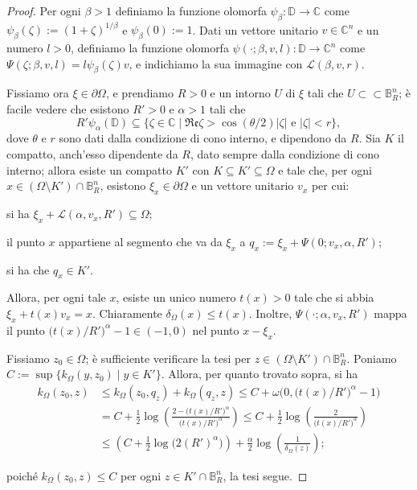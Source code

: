 \begin{proof}
    Per ogni $\beta>1$ definiamo la funzione olomorfa $\psi_\beta:\mathbb{D}\longrightarrow\mathbb{C}$ come $\psi_\beta(\zeta):=(1+\zeta)^{1/\beta}$ e $\psi_\beta(0):=1$. Dati un vettore unitario $v\in\mathbb{C}^n$ e un numero $l>0$, definiamo la funzione olomorfa $\psi(\cdot;\beta,v,l):\mathbb{D}\longrightarrow\mathbb{C}^n$ come $\Psi(\zeta;\beta,v,l)=l\psi_\beta(\zeta)v$, e indichiamo la sua immagine con $\mathcal{L}(\beta,v,r)$.
    
    Fissiamo ora $\xi\in\partial\Omega$, e prendiamo $R>0$ e un intorno $U$ di $\xi$ tali che $U\subset\subset\mathbb{B}^n_R$; è facile vedere che esistono $R'>0$ e $\alpha>1$ tali che
    $$R'\psi_\alpha(\mathbb{D})\subseteq \{\zeta\in\mathbb{C}\mid\mathfrak{Re}\zeta>\cos(\theta/2)|\zeta|\text{ e }|\zeta|<r\},$$
    dove $\theta$ e $r$ sono dati dalla condizione di cono interno, e dipendono da $R$. Sia $K$ il compatto, anch'esso dipendente da $R$, dato sempre dalla condizione di cono interno; allora esiste un compatto $K'$ con $K\subseteq K'\subseteq\Omega$ e tale che, per ogni $x\in(\Omega\setminus K')\cap\mathbb{B}^n_R$, esistono $\xi_x\in\partial\Omega$ e un vettore unitario $v_x$ per cui:
    \begin{nlist}
        \item si ha $\xi_x+\mathcal{L}(\alpha,v_x,R')\subseteq\Omega$;
        \item il punto $x$ appartiene al segmento che va da $\xi_x$ a $q_x:=\xi_x+\Psi(0;v_x,\alpha,R')$;
        \item si ha che $q_x\in K'$.
    \end{nlist}

    Allora, per ogni tale $x$, esiste un unico numero $t(x)>0$ tale che si abbia $\xi_x+t(x)v_x=x$. Chiaramente $\delta_\Omega(x)\le t(x)$. Inoltre, $\Psi(\cdot;\alpha,v_x,R')$ mappa il punto $\big(t(x)/R'\big)^\alpha-1\in(-1,0)$ nel punto $x-\xi_x$.

    Fissiamo $z_0\in\Omega$; è sufficiente verificare la tesi per $z\in (\Omega\setminus K')\cap \mathbb{B}^n_R$. Poniamo $C:=\sup\{k_\Omega(y,z_0)\mid y\in K'\}$. Allora, per quanto trovato sopra, si ha
    \begin{align*}
        k_\Omega(z_0,z)&\le k_\Omega(z_0,q_z)+k_\Omega(q_z,z) \le C+\omega\Big(0,\big(t(x)/R'\big)^\alpha-1\Big)\\
        &=C+\frac{1}{2}\log\left(\frac{2-\big(t(x)/R'\big)^\alpha}{\big(t(x)/R'\big)^\alpha}\right) \le C+\frac{1}{2}\log\left(\frac{2}{\big(t(x)/R'\big)^\alpha}\right)\\
        &\le \left(C+\frac{1}{2}\log\big(2(R')^\alpha\big)\right)+\frac{\alpha}{2}\log\left(\frac{1}{\delta_\Omega(z)}\right);
    \end{align*}

    poiché $k_\Omega(z_0,z) \le C$ per ogni $z\in K'\cap\mathbb{B}^n_R$, la tesi segue.
\end{proof}

